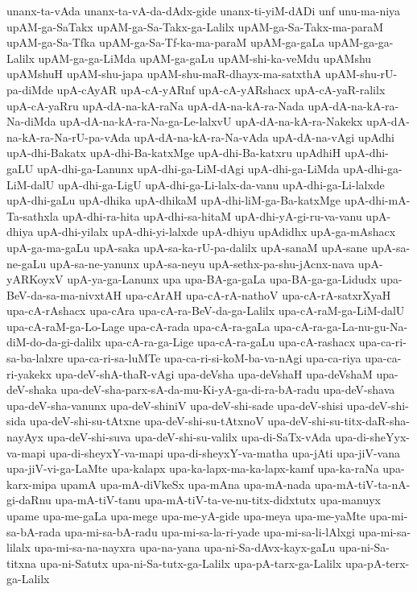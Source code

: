 {unanx-ta-vAda
unanx-ta-vA-da-dAdx-gide
unanx-ti-yiM-dADi
unf
unu-ma-niya
upAM-ga-SaTakx
upAM-ga-Sa-Takx-ga-Lalilx
upAM-ga-Sa-Takx-ma-paraM
upAM-ga-Sa-Tfka
upAM-ga-Sa-Tf-ka-ma-paraM
upAM-ga-gaLa
upAM-ga-ga-Lalilx
upAM-ga-ga-LiMda
upAM-ga-gaLu
upAM-shi-ka-veMdu
upAMshu
upAMshuH
upAM-shu-japa
upAM-shu-maR-dhayx-ma-satxthA
upAM-shu-rU-pa-diMde
upA-cAyAR
upA-cA-yARnf
upA-cA-yARshacx
upA-cA-yaR-ralilx
upA-cA-yaRru
upA-dA-na-kA-raNa
upA-dA-na-kA-ra-Nada
upA-dA-na-kA-ra-Na-diMda
upA-dA-na-kA-ra-Na-ga-Le-lalxvU
upA-dA-na-kA-ra-Nakekx
upA-dA-na-kA-ra-Na-rU-pa-vAda
upA-dA-na-kA-ra-Na-vAda
upA-dA-na-vAgi
upAdhi
upA-dhi-Bakatx
upA-dhi-Ba-katxMge
upA-dhi-Ba-katxru
upAdhiH
upA-dhi-gaLU
upA-dhi-ga-Lanunx
upA-dhi-ga-LiM-dAgi
upA-dhi-ga-LiMda
upA-dhi-ga-LiM-dalU
upA-dhi-ga-LigU
upA-dhi-ga-Li-lalx-da-vanu
upA-dhi-ga-Li-lalxde
upA-dhi-gaLu
upA-dhika
upA-dhikaM
upA-dhi-liM-ga-Ba-katxMge
upA-dhi-mA-Ta-sathxla
upA-dhi-ra-hita
upA-dhi-sa-hitaM
upA-dhi-yA-gi-ru-va-vanu
upA-dhiya
upA-dhi-yilalx
upA-dhi-yi-lalxde
upA-dhiyu
upAdidhx
upA-ga-mAshacx
upA-ga-ma-gaLu
upA-saka
upA-sa-ka-rU-pa-dalilx
upA-sanaM
upA-sane
upA-sa-ne-gaLu
upA-sa-ne-yanunx
upA-sa-neyu
upA-sethx-pa-shu-jAcnx-nava
upA-yARKoyxV
upA-ya-ga-Lanunx
upa
upa-BA-ga-gaLa
upa-BA-ga-ga-Lidudx
upa-BeV-da-sa-ma-nivxtAH
upa-cArAH
upa-cA-rA-nathoV
upa-cA-rA-satxrXyaH
upa-cA-rAshacx
upa-cAra
upa-cA-ra-BeV-da-ga-Lalilx
upa-cA-raM-ga-LiM-dalU
upa-cA-raM-ga-Lo-Lage
upa-cA-rada
upa-cA-ra-gaLa
upa-cA-ra-ga-La-nu-gu-Na-diM-do-da-gi-dalilx
upa-cA-ra-ga-Lige
upa-cA-ra-gaLu
upa-cA-rashacx
upa-ca-ri-sa-ba-lalxre
upa-ca-ri-sa-luMTe
upa-ca-ri-si-koM-ba-va-nAgi
upa-ca-riya
upa-ca-ri-yakekx
upa-deV-shA-thaR-vAgi
upa-deVsha
upa-deVshaH
upa-deVshaM
upa-deV-shaka
upa-deV-sha-parx-sA-da-mu-Ki-yA-ga-di-ra-bA-radu
upa-deV-shava
upa-deV-sha-vanunx
upa-deV-shiniV
upa-deV-shi-sade
upa-deV-shisi
upa-deV-shi-sida
upa-deV-shi-su-tAtxne
upa-deV-shi-su-tAtxnoV
upa-deV-shi-su-titx-daR-sha-nayAyx
upa-deV-shi-suva
upa-deV-shi-su-valilx
upa-di-SaTx-vAda
upa-di-sheYyx-va-mapi
upa-di-sheyxY-va-mapi
upa-di-sheyxY-va-matha
upa-jAti
upa-jiV-vana
upa-jiV-vi-ga-LaMte
upa-kalapx
upa-ka-lapx-ma-ka-lapx-kamf
upa-ka-raNa
upa-karx-mipa
upamA
upa-mA-diVkeSx
upa-mAna
upa-mA-nada
upa-mA-tiV-ta-nA-gi-daRnu
upa-mA-tiV-tanu
upa-mA-tiV-ta-ve-nu-titx-didxtutx
upa-manuyx
upame
upa-me-gaLa
upa-mege
upa-me-yA-gide
upa-meya
upa-me-yaMte
upa-mi-sa-bA-rada
upa-mi-sa-bA-radu
upa-mi-sa-la-ri-yade
upa-mi-sa-li-lAlxgi
upa-mi-sa-lilalx
upa-mi-sa-na-nayxra
upa-na-yana
upa-ni-Sa-dAvx-kayx-gaLu
upa-ni-Sa-titxna
upa-ni-Satutx
upa-ni-Sa-tutx-ga-Lalilx
upa-pA-tarx-ga-Lalilx
upa-pA-terx-ga-Lalilx
}
